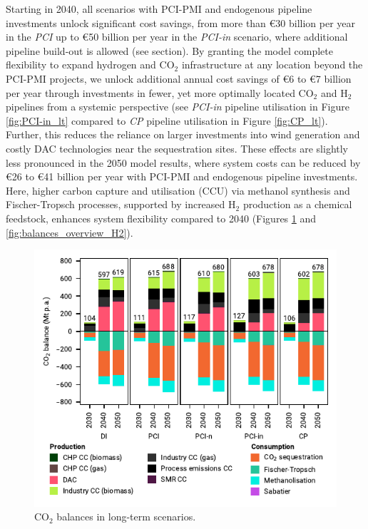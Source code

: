 \documentclass[pdflatex,sn-nature]{sn-jnl}%
\theoremstyle{thmstyleone}%
\theoremstyle{thmstyletwo}%
\theoremstyle{thmstylethree}%
\begin{document}
Starting in 2040, all scenarios with PCI-PMI and endogenous pipeline investments unlock significant cost savings, from more than €30 billion per year in the \textit{PCI} up to €50 billion per year in the \textit{PCI-in} scenario, where additional pipeline build-out is allowed (see  section).
By granting the model complete flexibility to expand hydrogen and CO$_2$ infrastructure at any location beyond the PCI-PMI projects, we unlock additional annual cost savings of €6 to €7 billion per year through investments in fewer, yet more optimally located CO$_2$ and H$_2$ pipelines from a systemic perspective (see \textit{PCI-in} pipeline utilisation in Figure \ref{fig:PCI-in_lt} compared to \textit{CP} pipeline utilisation in Figure \ref{fig:CP_lt}).
Further, this reduces the reliance on larger investments into wind generation and costly DAC technologies near the sequestration sites. These effects are slightly less pronounced in the 2050 model results, where system costs can be reduced by €26 to €41 billion per year with PCI-PMI and endogenous pipeline investments. Here, higher carbon capture and utilisation (CCU) via methanol synthesis and Fischer-Tropsch processes, supported by increased H$_2$ production as a chemical feedstock, enhances system flexibility compared to 2040 (Figures \ref{fig:balances_overview_co2_stored} and \ref{fig:balances_overview_H2}).

\begin{figure}[htbp]
  \centering
  \includegraphics{figures/balances_overview_co2 stored}
  \caption{CO$_2$ balances in long-term scenarios.}
  \label{fig:balances_overview_co2_stored}
\end{figure}
\end{document}
